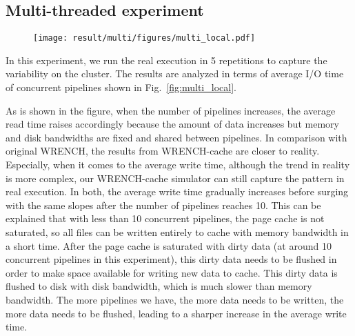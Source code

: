 \documentclass[conference]{IEEEtran}
\begin{document}
        \subsection{Multi-threaded experiment}

            \begin{figure*}
            \begin{subfigure}{\linewidth}
                \centering
                \texttt{[image: result/multi/figures/multi\_local.pdf]}
            \end{subfigure}
            \caption{I/O time of concurrent pipelines with local storage.}
            \label{fig:multi_local}
            \end{figure*}

            In this experiment, we run the real execution in 5 repetitions to
            capture the variability on the cluster.
            The results are analyzed in terms of average I/O time
            of concurrent pipelines shown in Fig.~\ref{fig:multi_local}.

            As is shown in the figure, when the number of pipelines increases,
            the average read time raises accordingly because the amount of data
            increases but memory and disk bandwidths are fixed and shared between pipelines.
            In comparison with original WRENCH, the results from WRENCH-cache are closer
            to reality.
            Especially, when it comes to the average write time,
            although the trend in reality is more complex, our WRENCH-cache
            simulator can still capture the pattern in real execution.
            In both, the average write time gradually increases before surging with the
            same slopes after the number of pipelines reaches 10.
            This can be explained that with less than 10 concurrent pipelines,
            the page cache is not saturated, so all files can be written entirely to
            cache with memory bandwidth in a short time.
            After the page cache is saturated with dirty data (at around
            10 concurrent pipelines in this experiment), this dirty data needs
            to be flushed in order to make space available for writing new data to cache.
            This dirty data is flushed to disk with disk bandwidth, which is much
            slower than memory bandwidth.
            The more pipelines we have, the more data needs to be written, the more data
            needs to be flushed, leading to a sharper increase in the average write time.
\end{document}
